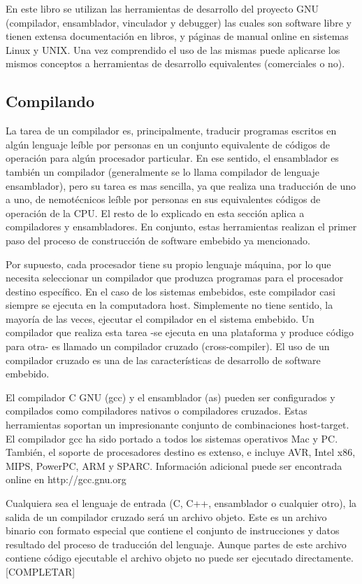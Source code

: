 \documentclass[12pt]{article}
\begin{document}
En este libro se utilizan las herramientas de desarrollo del proyecto GNU
(compilador, ensamblador, vinculador y debugger) las cuales son software libre
y tienen extensa documentación en libros, y páginas de manual online en sistemas
Linux y UNIX. Una vez comprendido
el uso de las mismas puede aplicarse los mismos conceptos a herramientas
de desarrollo equivalentes (comerciales o no).

\subsection *{Compilando}

La tarea de un compilador es, principalmente, traducir programas escritos en 
algún lenguaje leíble por personas en un conjunto equivalente
de códigos de operación para algún procesador particular. En ese sentido,
el ensamblador es también un compilador (generalmente se lo llama
compilador de lenguaje ensamblador), pero su tarea es mas sencilla, ya que
realiza una traducción de uno a uno, de nemotécnicos leíble por personas
en sus equivalentes códigos de operación de la CPU. El resto de lo explicado en esta sección
aplica a compiladores y ensambladores. En conjunto, estas herramientas
realizan el primer paso del proceso de construcción de software embebido
ya mencionado.

Por supuesto, cada procesador tiene su propio lenguaje máquina, por lo que
necesita seleccionar un compilador que produzca programas para el procesador
destino específico. En el caso de los sistemas embebidos,  este compilador
casi siempre se ejecuta en la computadora host. Simplemente no tiene sentido,
la mayoría de las veces, ejecutar el compilador en el sistema embebido.
Un compilador que realiza esta tarea -se ejecuta en una plataforma  y produce
código para otra- es llamado un compilador cruzado (cross-compiler). El uso de
un compilador cruzado es una de las características de desarrollo de software
embebido.

El compilador C GNU (gcc) y el ensamblador (as) pueden ser configurados y compilados
como compiladores nativos o compiladores cruzados. Estas herramientas soportan
un impresionante conjunto de combinaciones host-target. El compilador gcc ha sido
portado a todos los sistemas operativos Mac y PC. También, el soporte de procesadores destino
es extenso, e incluye AVR, Intel x86, MIPS, PowerPC, ARM y SPARC. Información
adicional puede ser encontrada online en http://gcc.gnu.org

Cualquiera sea el lenguaje de entrada (C, C++, ensamblador o cualquier otro), la salida
de un compilador cruzado será un archivo objeto. Este es un archivo binario con
formato especial que contiene el conjunto de instrucciones y datos
resultado del proceso de traducción del lenguaje. Aunque partes de este archivo
contiene código ejecutable el archivo objeto no puede ser ejecutado directamente.
[COMPLETAR]
\end{document}
